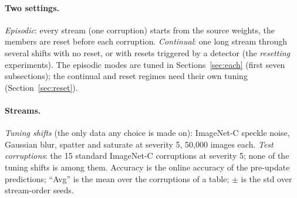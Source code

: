 \documentclass[10pt]{article}
\newcommand{\rl}[1]{\texttt{#1}}
\begin{document}
\begin{table}[H]
  \centering\small
  \caption{The modes, what adapts on which entropy, and where the gate is. Regime = the key of the file that holds its learning rates (\rl{cfgs/duo\_lrs/<duo>\_\_<regime>.yaml}).}
  \label{tab:modes_def}
\end{table}

\paragraph{Two settings.} \emph{Episodic}: every stream (one corruption) starts from the source weights, the members are reset before each corruption. \emph{Continual}: one long stream through several shifts with no reset, or with resets triggered by a detector (the \emph{resetting} experiments). The episodic modes are tuned in Sections~\ref{sec:each} (first seven subsections); the continual and reset regimes need their own tuning (Section~\ref{sec:reset}).

\paragraph{Streams.} \emph{Tuning shifts} (the only data any choice is made on): ImageNet-C speckle noise, Gaussian blur, spatter and saturate at severity 5, 50,000 images each. \emph{Test corruptions}: the 15 standard ImageNet-C corruptions at severity 5; none of the tuning shifts is among them. Accuracy is the online accuracy of the pre-update predictions; ``Avg'' is the mean over the corruptions of a table; \(\pm\) is the std over stream-order seeds.
\end{document}
